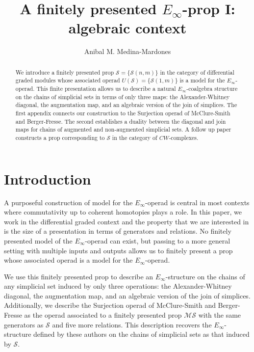 \documentclass{amsart}
\renewcommand{\S}{\mathcal{S}}
\newcommand{\MS}{\mathcal{MS}}
\theoremstyle{definition}
\begin{document}
	\title{A finitely presented $E_\infty$-prop I: algebraic context}
	\author{Anibal M. Medina-Mardones}
	\address{Laboratory of Topology and Neuroscience, \'{E}cole Polytechnique F\'{e}d\'{e}rale de Lausanne,
	Route Cantonale, 1015 Lausanne, Switzerland}
	\address{Department of Mathematics, University of Notre Dame du Lac, Notre Dame, IN 46556, United States}
	
	\maketitle
	
	\begin{abstract}
		We introduce a finitely presented prop $\mathcal{S} = \{\mathcal{S}(n,m)\}$ in the category of differential graded modules whose associated operad $U(\mathcal{S})=\{\mathcal{S}(1,m)\}$ is a model for the $E_\infty$-operad. This finite presentation allows us to describe a natural $E_\infty$-coalgebra structure on the chains of simplicial sets in terms of only three maps: the Alexander-Whitney diagonal, the augmentation map, and an algebraic version of the join of simplices. The first appendix connects our construction to the Surjection operad of McClure-Smith and Berger-Fresse. The second establishes a duality between the diagonal and join maps for chains of augmented and non-augmented simplicial sets. A follow up paper \cite{medina2018cellular} constructs a prop corresponding to $\S$ in the category of $CW$-complexes.
	\end{abstract}
	
	\section{Introduction}
	A purposeful construction of model for the $E_\infty$-operad is central in most contexts where commutativity up to coherent homotopies plays a role. In this paper, we work in the differential graded context and the property that we are interested in is the size of a presentation in terms of generators and relations. No finitely presented model of the $E_\infty$-operad can exist, but passing to a more general setting with multiple inputs and outputs allows us to finitely present a prop whose associated operad is a model for the $E_\infty$-operad. 
	
	We use this finitely presented prop to describe an $E_\infty$-structure on the chains of any simplicial set induced by only three operations: the Alexander-Whitney diagonal, the augmentation map, and an algebraic version of the join of simplices. Additionally, we describe the Surjection operad of McClure-Smith \cite{mcclure2003multivariable} and Berger-Fresse \cite{berger2004combinatorial} as the operad associated to a finitely presented prop $\MS$ with the same generators as $\S$ and five more relations. This description recovers the $E_\infty$-structure defined by these authors on the chains of simplicial sets as that induced by $\S$. 
	
\end{document}
